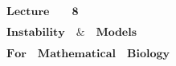 \setcounter{section}{0}
\setcounter{equation}{0}
\newpage
\vspace*{\fill}
\begingroup
\thispagestyle{empty}
\begin{center}
    \fontsize{40pt}{0} $\mathbf{Lecture \qquad 8}$
    \par
    \fontsize{40pt}{0} $\mathbf{Instability \quad\&\quad Models}$
    \par
    \hspace*{-1.5cm}\fontsize{40pt}{0} $\mathbf{For \quad Mathematical \quad Biology}$
\end{center}
\endgroup
\vspace*{\fill}
\newpage